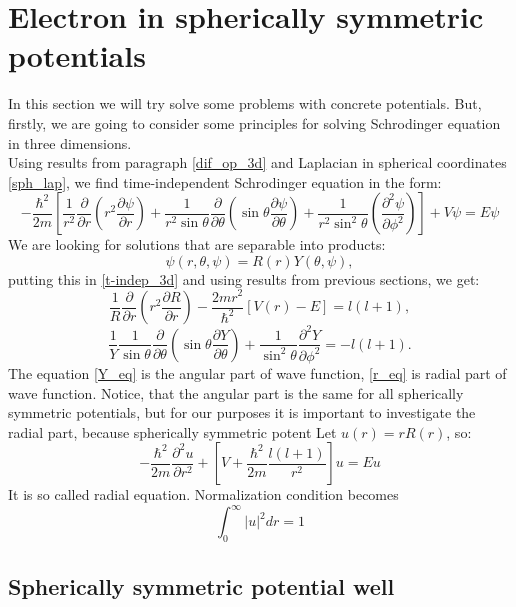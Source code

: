 \documentclass[a4paper, 12pt]{article}
\begin{document}
\section{Electron in spherically symmetric potentials}
In this section we will try solve some problems with concrete potentials. But, firstly, we are going to consider some principles for solving  Schrodinger equation in three dimensions.\\
Using results from paragraph \ref{dif_op_3d} and Laplacian in spherical coordinates \eqref{sph_lap},  we find time-independent Schrodinger equation in the form:
\begin{equation}\label{t-indep_3d}
-\frac{\hbar^2}{2m}[\frac{1}{r^2} \frac{\partial}{\partial r}({r^2}\frac{\partial \psi}{\partial r})+\frac{1}{r^2\sin{\theta}}\frac{\partial}{\partial \theta}(\sin{\theta}\frac{\partial \psi}{\partial \theta})+\frac{1}{r^2\sin^2{\theta}}(\frac{\partial^2 \psi}{\partial \phi^2}) ] + V\psi = E \psi
\end{equation}
We are looking for solutions that are separable into products:
$$\psi (r, \theta, \psi) = R(r)Y(\theta, \psi),$$
putting this in \eqref{t-indep_3d} and using results from previous sections, we get:
\begin{equation}\label{r_eq}
	\frac{1}{R}\frac{\partial}{\partial r}(r^2 \frac{\partial R}{\partial r}) - \frac{2m r^2}{\hbar^2}[V(r)-E] = l(l+1),
\end{equation}
\begin{equation}\label{Y_eq}
	\frac{1}{Y}\frac{1}{\sin \theta}\frac{\partial}{\partial \theta}(\sin \theta \frac{\partial Y}{\partial \theta}) + \frac{1}{\sin^2 \theta}\frac{\partial^2 Y}{\partial \phi^2}=-l(l+1).
\end{equation}
The equation \eqref{Y_eq} is the angular part of wave function, \eqref{r_eq} is radial part of wave function. Notice, that  the angular part is the same for all spherically symmetric potentials, but for our purposes it is important to investigate the radial part, because spherically symmetric potent%
Let $u(r) = r R(r)$, so:
\begin{equation}\label{r_eq}
	-\frac{\hbar^2}{2m}\frac{\partial^2 u}{\partial r^2}+[V+\frac{\hbar^2}{2m}\frac{l(l+1)}{r^2}]u = Eu
\end{equation}
It is so called radial equation. Normalization condition becomes
$$\int_{0}^{\infty} |u|^2  dr=1$$

\subsection{Spherically symmetric potential well}
\end{document}
